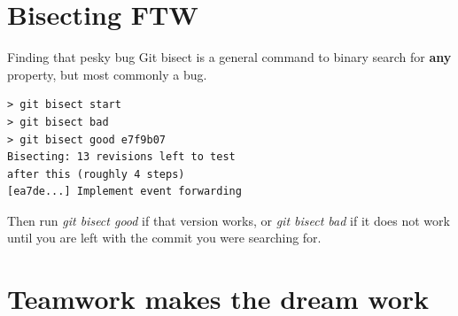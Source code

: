 \documentclass[10pt]{beamer}
\begin{document}
\section{Bisecting FTW}
\begin{frame}[fragile]{Finding that pesky bug}
  Git bisect is a general command to binary search for \textbf{any} property, but most commonly a bug.

  \begin{lstlisting}
> git bisect start
> git bisect bad
> git bisect good e7f9b07
Bisecting: 13 revisions left to test
after this (roughly 4 steps)
[ea7de...] Implement event forwarding
  \end{lstlisting}
  Then run \textit{git bisect good} if that version works, or \textit{git bisect bad} if it does not work until you are left with the commit you were searching for.
\end{frame}

\section{Teamwork makes the dream work}
\end{document}
